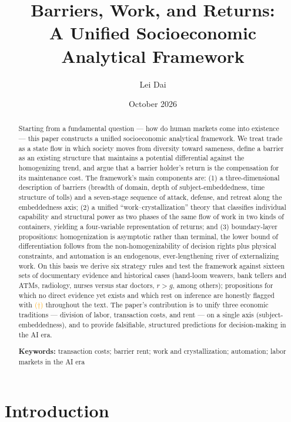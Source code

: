 \documentclass[11pt]{article}
\title{Barriers, Work, and Returns:\\A Unified Socioeconomic Analytical Framework}
\author{Lei Dai}
\date{October 2026}
\newcommand{\infmark}{\textcolor{orange}{(\(\dagger\))}}
\begin{document}
\maketitle

\begin{abstract}
Starting from a fundamental question --- how do human markets come into existence --- this paper constructs a unified socioeconomic analytical framework. We treat trade as a state flow in which society moves from diversity toward sameness, define a barrier as an existing structure that maintains a potential differential against the homogenizing trend, and argue that a barrier holder's return is the compensation for its maintenance cost. The framework's main components are: (1) a three-dimensional description of barriers (breadth of domain, depth of subject-embeddedness, time structure of tolls) and a seven-stage sequence of attack, defense, and retreat along the embeddedness axis; (2) a unified ``work--crystallization'' theory that classifies individual capability and structural power as two phases of the same flow of work in two kinds of containers, yielding a four-variable representation of returns; and (3) boundary-layer propositions: homogenization is asymptotic rather than terminal, the lower bound of differentiation follows from the non-homogenizability of decision rights plus physical constraints, and automation is an endogenous, ever-lengthening river of externalizing work. On this basis we derive six strategy rules and test the framework against sixteen sets of documentary evidence and historical cases (hand-loom weavers, bank tellers and ATMs, radiology, nurses versus star doctors, $r>g$, among others); propositions for which no direct evidence yet exists and which rest on inference are honestly flagged with \infmark{} throughout the text. The paper's contribution is to unify three economic traditions --- division of labor, transaction costs, and rent --- on a single axis (subject-embeddedness), and to provide falsifiable, structured predictions for decision-making in the AI era.

\medskip
\noindent\textbf{Keywords:} transaction costs; barrier rent; work and crystallization; automation; labor markets in the AI era
\end{abstract}

\section{Introduction}
\end{document}
